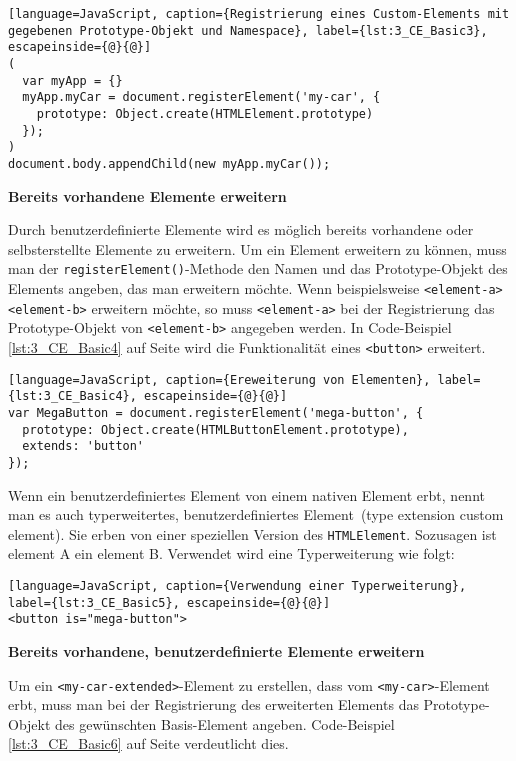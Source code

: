 \begin{lstlisting}[language=JavaScript, caption={Registrierung eines Custom-Elements mit gegebenen Prototype-Objekt und Namespace}, label={lst:3_CE_Basic3}, escapeinside={@}{@}]
(
  var myApp = {}
  myApp.myCar = document.registerElement('my-car', {
    prototype: Object.create(HTMLElement.prototype)
  });
)
document.body.appendChild(new myApp.myCar());
\end{lstlisting}

\textbf{Bereits vorhandene Elemente erweitern}

Durch benutzerdefinierte Elemente wird es möglich bereits vorhandene oder selbsterstellte Elemente zu erweitern. Um ein Element erweitern zu können, muss man der \lstinline|registerElement()|-Methode den Namen und das Prototype-Objekt des Elements angeben, das man erweitern möchte. Wenn beispielsweise \lstinline|<element-a>| \lstinline|<element-b>| erweitern möchte, so muss \lstinline|<element-a>| bei der Registrierung das Prototype-Objekt von \lstinline|<element-b>| angegeben werden. In Code-Beispiel \ref{lst:3_CE_Basic4} auf Seite \pageref{lst:3_CE_Basic4} wird die Funktionalität eines \lstinline|<button>| erweitert.

\begin{lstlisting}[language=JavaScript, caption={Ereweiterung von Elementen}, label={lst:3_CE_Basic4}, escapeinside={@}{@}]
var MegaButton = document.registerElement('mega-button', {
  prototype: Object.create(HTMLButtonElement.prototype),
  extends: 'button'
});
\end{lstlisting}

Wenn ein benutzerdefiniertes Element von einem nativen Element erbt, nennt man es auch \glqq typerweitertes, benutzerdefiniertes Element\grqq\ (type extension custom element). Sie erben von einer speziellen Version des \lstinline|HTMLElement|. Sozusagen \glqq ist element A ein element B\grqq . Verwendet wird eine Typerweiterung wie folgt:

\begin{lstlisting}[language=JavaScript, caption={Verwendung einer Typerweiterung}, label={lst:3_CE_Basic5}, escapeinside={@}{@}]
<button is="mega-button">
\end{lstlisting}

\textbf{Bereits vorhandene, benutzerdefinierte Elemente erweitern}

Um ein \lstinline|<my-car-extended>|-Element zu erstellen, dass vom \lstinline|<my-car>|-Element erbt, muss man bei der Registrierung des erweiterten Elements das Prototype-Objekt des gewünschten \glqq Basis\grqq -Element angeben. Code-Beispiel \ref{lst:3_CE_Basic6} auf Seite \pageref{lst:3_CE_Basic6} verdeutlicht dies.

